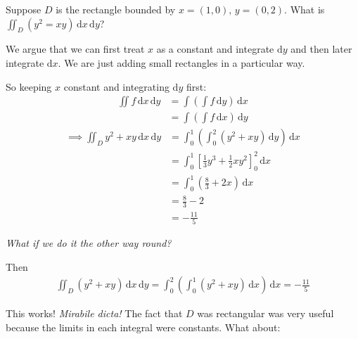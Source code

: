 \documentclass[10pt]{scrartcl}
\begin{document}
\begin{example} Suppose $D$ is the rectangle bounded by $x = (1,0),\, y= (0,2)$. What is $\iint_D (y^2 = xy)\,\mathrm{d}x\,\mathrm{d}y$?



\begin{center}
\end{center}

We argue that we can first treat $x$ as a constant and integrate $\mathrm{d}y$ and then later integrate $\mathrm{d}x$. We are just adding small rectangles in a particular way. 

So keeping $x$ constant and integrating $\mathrm{d}y$ first: 
\begin{align*}
    \iint f\,\mathrm{d}x\,\mathrm{d}y &= \int\left(\int f\,\mathrm{d}y\right)\,\mathrm{d}x\\
    &= \int\left(\int f\,\mathrm{d}x\right)\,\mathrm{d}y
\end{align*}
\begin{align*}
  \implies \iint_D y^2 + xy\,\mathrm{d}x\,\mathrm{d}y &= \int_0^1 \left(\int_0^2 (y^2 + xy)\,\mathrm{d}y\right)\,\mathrm{d}x\\
  &= \int_0^1 \left[\frac{1}{3}y^3 + \frac{1}{2}xy^2\right]^2_0\,\mathrm{d}x\\
  &=\int_0^1 (\textstyle{\frac{8}{3}} + 2x)\,\mathrm{d}x\\
  &=\textstyle{\frac{8}{3}} - 2\\
  &= -\frac{11}{5}
\end{align*}

\emph{What if we do it the other way round?}

Then 
\begin{align*}
  \iint_D (y^2 + xy)\,\mathrm{d}x\,\mathrm{d}y = \int_0^2 \left(\int_0^1 (y^2 + xy)\,\mathrm{d}x\right)\,\mathrm{d}x = -\frac{11}{5}
\end{align*}
\end{example}


This works! \emph{Mirabile dicta!} The fact that $D$ was rectangular was very useful because the limits in each integral were constants. What about:\\
\end{document}
